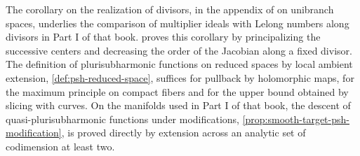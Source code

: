 The corollary on the realization of divisors, in the appendix of \cite{XiaSampleBook} on unibranch spaces, underlies the comparison of multiplier ideals with Lelong numbers along divisors in Part I of that book.  proves this corollary by principalizing the successive centers and decreasing the order of the Jacobian along a fixed divisor. The definition of plurisubharmonic functions on reduced spaces by local ambient extension, \cref{def:psh-reduced-space}, suffices for pullback by holomorphic maps, for the maximum principle on compact fibers and for the upper bound obtained by slicing with curves. On the manifolds used in Part I of that book, the descent of quasi-plurisubharmonic functions under modifications, \cref{prop:smooth-target-psh-modification}, is proved directly by extension across an analytic set of codimension at least two.
